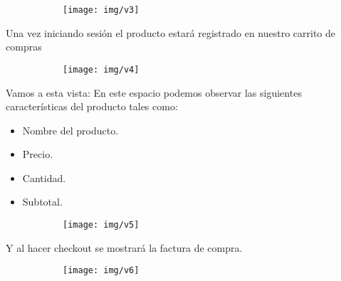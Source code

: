 \documentclass[letterpaper,12pt]{article}
\begin{document}
	\begin{figure}[H]

		\begin{subfigure}{20cm}

			\centering

			\texttt{[image: img/v3]}

		\end{subfigure}

	\end{figure}

	Una vez iniciando sesión el producto estará registrado en nuestro carrito de compras
	
	\begin{figure}[H]

		\begin{subfigure}{20cm}

			\centering

			\texttt{[image: img/v4]}

		\end{subfigure}

	\end{figure}

	Vamos a esta vista:
	En este espacio podemos observar las siguientes características del producto tales como:
	
	\begin{itemize}
		\item Nombre del producto.
		\item Precio.
		\item Cantidad.
		\item Subtotal.
	\end{itemize}

	\begin{figure}[H]

		\begin{subfigure}{20cm}

			\centering

			\texttt{[image: img/v5]}

		\end{subfigure}

	\end{figure}

Y al hacer checkout se mostrará la factura de compra.

\begin{figure}[H]

	\begin{subfigure}{20cm}

		\centering

		\texttt{[image: img/v6]}

	\end{subfigure}

\end{figure}
	
\end{document}
